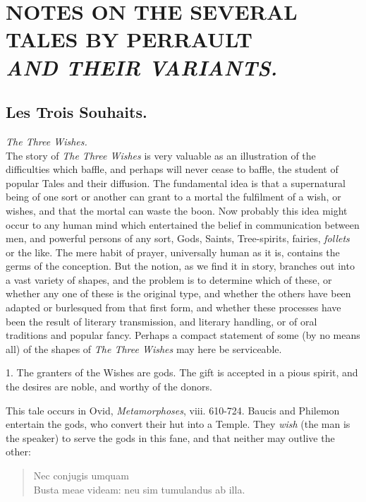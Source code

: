 \documentclass[14pt,a4paper]{memoir}
\begin{document}
\chapter[NOTES ON THE SEVERAL TALES BY PIERRAULT]{NOTES ON THE SEVERAL TALES BY PERRAULT\\[1ex] \large \itshape AND THEIR VARIANTS.}

\section{Les Trois Souhaits.}

\emph{The Three Wishes.} \\

The story of \emph{The Three Wishes} is very valuable as an illustration
of the difficulties which baffle, and perhaps will never cease to
baffle, the student of popular Tales and their diffusion. The
fundamental idea is that a supernatural being of one sort or another can
grant to a mortal the fulfilment of a wish, or wishes, and that the
mortal can waste the boon. Now probably this idea might occur to any
human mind which entertained the belief in communication between men,
and powerful persons of any sort, Gods, Saints, Tree-spirits, fairies,
\emph{follets} or the like. The mere habit of prayer, universally human
as it is, contains the germs of the conception. But the notion, as we
find it in story, branches out into a vast variety of shapes, and the
problem is to determine which of these, or whether any one of these is
the original type, and whether the others have been adapted or
burlesqued from that first form, and whether these processes have been
the result of literary transmission, and literary handling, or of oral
traditions and popular fancy. Perhaps a compact statement of some (by no
means all) of the shapes of \emph{The Three Wishes} may here be
serviceable.

1. The granters of the Wishes are gods. The gift is accepted in a pious
spirit, and the desires are noble, and worthy of the donors.

This tale occurs in Ovid, \emph{Metamorphoses}, viii. 610-724. Baucis
and Philemon entertain the gods, who convert their hut into a Temple.
They \emph{wish} (the man is the speaker) to serve the gods in this
fane, and that neither may outlive the other:

\begin{verse}
\small
\foreignlanguage{latin}{Nec conjugis umquam \\
Busta meae videam: neu sim tumulandus ab illa.}
\end{verse}
\end{document}
